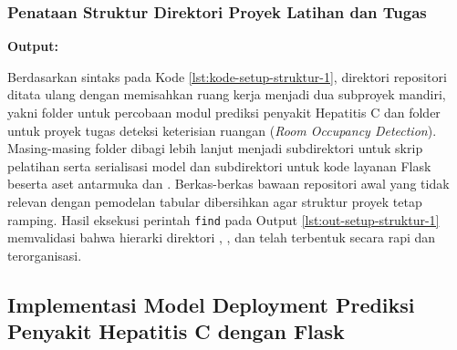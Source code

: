 \documentclass[a4paper,oneside,11pt]{book}
\begin{document}
\subsubsection{Penataan Struktur Direktori Proyek Latihan dan Tugas}

\par \textbf{Output:}

\par Berdasarkan sintaks pada Kode \ref{lst:kode-setup-struktur-1}, direktori repositori  ditata ulang dengan memisahkan ruang kerja menjadi dua subproyek mandiri, yakni folder  untuk percobaan modul prediksi penyakit Hepatitis C dan folder  untuk proyek tugas deteksi keterisian ruangan (\textit{Room Occupancy Detection}). Masing-masing folder dibagi lebih lanjut menjadi subdirektori  untuk skrip pelatihan serta serialisasi model dan subdirektori  untuk kode layanan Flask beserta aset antarmuka  dan . Berkas-berkas bawaan repositori awal yang tidak relevan dengan pemodelan tabular dibersihkan agar struktur proyek tetap ramping. Hasil eksekusi perintah \texttt{find} pada Output \ref{lst:out-setup-struktur-1} memvalidasi bahwa hierarki direktori , , dan  telah terbentuk secara rapi dan terorganisasi.

\subsection{Implementasi Model Deployment Prediksi Penyakit Hepatitis C dengan Flask}
\end{document}
